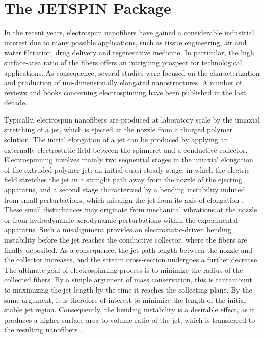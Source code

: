 
\section{The JETSPIN Package\label{sec:The-JETSPIN-Package}}

In the recent years, electrospun nanofibers have gained a considerable
industrial interest due to many possible applications, such as tissue
engineering, air and water filtration, drug delivery and regenerative
medicine. In particular, the high surface-area ratio of the fibers
offers an intriguing prospect for technological applications. As consequence,
several studies were focused on the characterization and production
of uni-dimensionally elongated nanostructures. A number of reviews
\cite{li2004electrospinning,greiner2007electrospinning,carroll2008nanofibers,huang2003review,persano2013industrial}
and books \cite{yarin2014fundamentals,wendorff2012electrospinning,pisignanoelectrospinning}
concerning electrospinning have been published in the last decade.

Typically, electrospun nanofibers are produced at laboratory scale
by the uniaxial stretching of a jet, which is ejected at the nozzle
from a charged polymer solution. The initial elongation of a jet can
be produced by applying an externally electrostatic field between
the spinneret and a conductive collector. Electrospinning involves
mainly two sequential stages in the uniaxial elongation of the extruded
polymer jet: an initial quasi steady stage, in which the electric
field stretches the jet in a straight path away from the nozzle of
the ejecting apparatus, and a second stage characterized by a bending
instability induced from small perturbations, which misalign the jet
from its axis of elongation \cite{zeng2006numerical}. These small
disturbances may originate from mechanical vibrations at the nozzle
or from hydrodynamic-aerodynamic perturbations within the experimental
apparatus. Such a misalignment provides an electrostatic-driven bending
instability before the jet reaches the conductive collector, where
the fibers are finally deposited. As a consequence, the jet path length
between the nozzle and the collector increases, and the stream cross-section
undergoes a further decrease. The ultimate goal of electrospinning
process is to minimize the radius of the collected fibers. By a simple
argument of mass conservation, this is tantamount to maximizing the
jet length by the time it reaches the collecting plane. By the same
argument, it is therefore of interest to minimize the length of the
initial stable jet region. Consequently, the bending instability is
a desirable effect, as it produces a higher surface-area-to-volume
ratio of the jet, which is transferred to the resulting nanofibers
\cite{feng2003stretching}.

